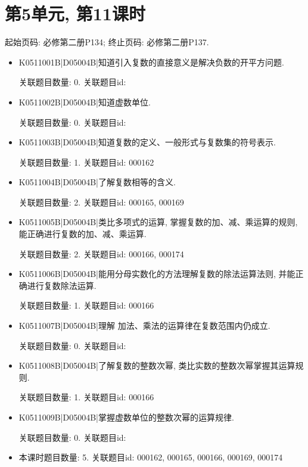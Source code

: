\section*{第5单元, 第11课时}
起始页码: 必修第二册P134; 终止页码: 必修第二册P137.
\begin{itemize}
\item K0511001B|D05004B|知道引入复数的直接意义是解决负数的开平方问题.

关联题目数量: 0. 关联题目id: 

\item K0511002B|D05004B|知道虚数单位.

关联题目数量: 0. 关联题目id: 

\item K0511003B|D05004B|知道复数的定义、一般形式与复数集的符号表示.

关联题目数量: 1. 关联题目id: 000162

\item K0511004B|D05004B|了解复数相等的含义.

关联题目数量: 2. 关联题目id: 000165, 000169

\item K0511005B|D05004B|类比多项式的运算, 掌握复数的加、减、乘运算的规则, 能正确进行复数的加、减、乘运算.

关联题目数量: 2. 关联题目id: 000166, 000174

\item K0511006B|D05004B|能用分母实数化的方法理解复数的除法运算法则, 并能正确进行复数除法运算.

关联题目数量: 1. 关联题目id: 000166

\item K0511007B|D05004B|理解 加法、乘法的运算律在复数范围内仍成立.

关联题目数量: 0. 关联题目id: 

\item K0511008B|D05004B|了解复数的整数次幂, 类比实数的整数次幂掌握其运算规则.

关联题目数量: 1. 关联题目id: 000166

\item K0511009B|D05004B|掌握虚数单位的整数次幂的运算规律.

关联题目数量: 0. 关联题目id: 

\item 本课时题目数量: 5. 关联题目id: 000162, 000165, 000166, 000169, 000174

\end{itemize}

